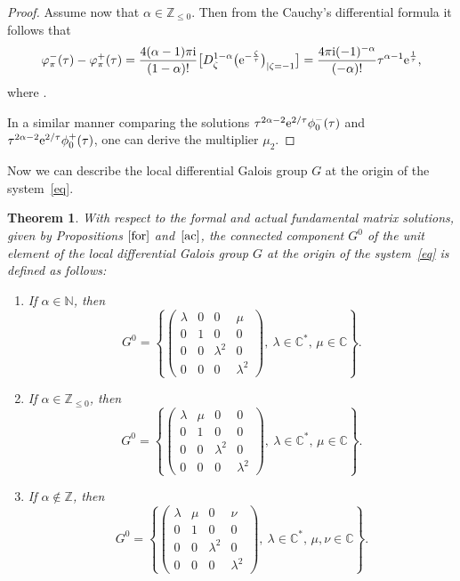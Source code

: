 \documentclass[pdftex]{sigma}
\numberwithin{equation}{section}
\newtheorem{Theorem}{Theorem}[section]
\begin{document}
\begin{proof}
 Assume now that $\alpha\in\mathbb{Z}_{\leq 0}$. Then from the Cauchy's differential formula it follows that
 \[
 \varphi^{-}_{\pi}(\tau) - \varphi^{+}_{\pi}(\tau)
 =
 \frac{4 (\alpha-1) \pi {\rm i}}{(1-\alpha)!}
 \bigl[ D_{\zeta}^{1-\alpha} \bigl({\rm e}^{-\frac{\zeta}{\tau}}\bigr)_{| \zeta=-1}\bigr]
 =\frac{4 \pi {\rm i} (-1)^{-\alpha}}{(-\alpha)!} \tau^{\alpha-1} {\rm e}^{\frac{1}{\tau}} ,
 \]
 where .

 In a similar manner comparing the solutions $ \tau^{2 \alpha-2} {\rm e}^{2/\tau} \phi_0^{-}(\tau)$ and $ \tau^{2 \alpha-2} {\rm e}^{2/\tau} \phi_0^{+}(\tau)$,
 one can derive the multiplier $\mu_2$.
\end{proof}

 Now we can describe the local differential Galois group $G$ at the origin of the system~\eqref{eq}.

 \begin{Theorem}\label{gal-inf}
 With respect to the formal and actual fundamental matrix solutions, given by Propositions $\ref{for}$ and~$\ref{ac}$, the connected
 component $G^0$ of the unit element of the local differential Galois group $G$ at the origin of the system~\eqref{eq} is
 defined as follows:
 \begin{enumerate}
 \itemsep=0pt 	
 \item[$1.$]
 	If $\alpha\in\mathbb{N}$, then
 	\[
 	 G^0=\left\{\begin{pmatrix}
 	 \lambda & 0 & 0 & \mu\\
 	 0 & 1 & 0 & 0\\
 	 0 & 0 & \lambda^2 & 0\\
 	 0 & 0 & 0 & \lambda^2
 	 \end{pmatrix}, \ 	 \lambda\in\mathbb{C}^*,\, \mu\in\mathbb{C}\right\} .
 	\]
 	
 \item[$2.$]
 If $\alpha\in\mathbb{Z}_{\leq 0}$, then
 		\[
 		G^0=\left\{\begin{pmatrix}
 		\lambda & \mu & 0 & 0\\
 		0 & 1 & 0 & 0\\
 		0 & 0 & \lambda^2 & 0\\
 		0 & 0 & 0 & \lambda^2
 		\end{pmatrix}, \
 		\lambda\in\mathbb{C}^*,\, \mu\in\mathbb{C}\right\} .
 		\]
 		
 \item[$3.$]
 If $\alpha\notin\mathbb{Z}$, then
 	\[
 	G^0=\left\{\begin{pmatrix}
 	\lambda & \mu & 0 & \nu\\
 	0 & 1 & 0 & 0\\
 	0 & 0 & \lambda^2 & 0\\
 	0 & 0 & 0 & \lambda^2
 	\end{pmatrix}, \
 	\lambda\in\mathbb{C}^*,\, \mu, \nu\in\mathbb{C}\right\} .
 	\] 		
 	\end{enumerate}
 \end{Theorem}
\end{document}
